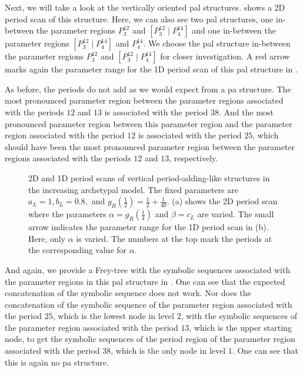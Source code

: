 Next, we will take a look at the vertically oriented \gls{pal} structures.
 shows a 2D period scan of this structure.
Here, we can also see two \gls{pal} structures, one in-between the parameter regions $P^{12}_3$ and $\left[P^{12}_3 \mid P^{14}_4\right]$ and one in-between the parameter regions $\left[P^{12}_3 \mid P^{14}_4\right]$ and $P^{14}_4$.
We choose the \gls{pal} structure in-between the parameter regions $P^{12}_3$ and $\left[P^{12}_3 \mid P^{14}_4\right]$ for closer investigation.
A red arrow marks again the parameter range for the 1D period scan of this \gls{pal} structure in .

As before, the periods do not add as we would expect from a \gls{pa} structure.
The most pronounced parameter region between the parameter regions associated with the periods $12$ and $13$ is associated with the period $38$.
And the most pronounced parameter region between this parameter region and the parameter region associated with the period $12$ is associated with the period $25$, which should have been the most pronounced parameter region between the parameter regions associated with the periods $12$ and $13$, respectively.

\begin{figure}
	\centering
	\caption[2D and 1D period scans of vertical period-adding-like structures in the increasing archetypal model]{
		2D and 1D period scans of vertical period-adding-like structures in the increasing archetypal model.
		The fixed parameters are $a_L = 1, b_L = 0.8,$ and $g_R\left(\frac{1}{2}\right) = \frac{1}{2} + \frac{1}{40}$.
		(a) shows the 2D period scan where the parameters $\alpha = g_R\left(\frac{1}{4}\right)$ and $\beta = c_L$ are varied.
		The small arrow indicates the parameter range for the 1D period scan in (b).
		Here, only $\alpha$ is varied.
		The numbers at the top mark the periods at the corresponding value for $\alpha$.
	}
	\label{fig:add.add.like.vert}
\end{figure}

And again, we provide a Frey-tree with the symbolic sequences associated with the parameter regions in this \gls{pal} structure in .
One can see that the expected concatenation of the symbolic sequence does not work.
Nor does the concatenation of the symbolic sequence of the parameter region associated with the period $25$, which is the lowest node in level $2$, with the symbolic sequences of the parameter region associated with the period $13$, which is the upper starting node, to get the symbolic sequences of the period region of the parameter region associated with the period $38$, which is the only node in level $1$.
One can see that this is again no \gls{pa} structure.

